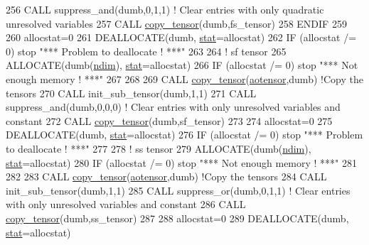 \begin{DoxyCode}
256         \textcolor{keyword}{CALL }suppress\_and(dumb,0,1,1) \textcolor{comment}{! Clear entries with only quadratic unresolved variables }
257         \textcolor{keyword}{CALL }\hyperlink{namespacetensor_a4a88ee8077278486c5128ad97617969e}{copy\_tensor}(dumb,fs\_tensor)
258 \textcolor{keywordflow}{    ENDIF}
259 
260     allocstat=0
261     \textcolor{keyword}{DEALLOCATE}(dumb, \hyperlink{namespacestat}{stat}=allocstat)
262     \textcolor{keywordflow}{IF} (allocstat /= 0)  stop \textcolor{stringliteral}{"*** Problem to deallocate ! ***"}
263 
264     \textcolor{comment}{! sf tensor}
265     \textcolor{keyword}{ALLOCATE}(dumb(\hyperlink{namespaceparams_a2323fe1773f086e20c14f266351c482b}{ndim}), \hyperlink{namespacestat}{stat}=allocstat)
266     \textcolor{keywordflow}{IF} (allocstat /= 0) stop \textcolor{stringliteral}{"*** Not enough memory ! ***"}
267 
268 
269     \textcolor{keyword}{CALL }\hyperlink{namespacetensor_a4a88ee8077278486c5128ad97617969e}{copy\_tensor}(\hyperlink{namespaceaotensor__def_a0dc43bc9294a18f2fe57b67489f1702f}{aotensor},dumb) \textcolor{comment}{!Copy the tensors}
270     \textcolor{keyword}{CALL }init\_sub\_tensor(dumb,1,1)
271     \textcolor{keyword}{CALL }suppress\_and(dumb,0,0,0) \textcolor{comment}{! Clear entries with only unresolved variables and constant}
272     \textcolor{keyword}{CALL }\hyperlink{namespacetensor_a4a88ee8077278486c5128ad97617969e}{copy\_tensor}(dumb,sf\_tensor)
273 
274     allocstat=0
275     \textcolor{keyword}{DEALLOCATE}(dumb, \hyperlink{namespacestat}{stat}=allocstat)
276     \textcolor{keywordflow}{IF} (allocstat /= 0)  stop \textcolor{stringliteral}{"*** Problem to deallocate ! ***"}
277 
278     \textcolor{comment}{! ss tensor}
279     \textcolor{keyword}{ALLOCATE}(dumb(\hyperlink{namespaceparams_a2323fe1773f086e20c14f266351c482b}{ndim}), \hyperlink{namespacestat}{stat}=allocstat)
280     \textcolor{keywordflow}{IF} (allocstat /= 0) stop \textcolor{stringliteral}{"*** Not enough memory ! ***"}
281 
282 
283     \textcolor{keyword}{CALL }\hyperlink{namespacetensor_a4a88ee8077278486c5128ad97617969e}{copy\_tensor}(\hyperlink{namespaceaotensor__def_a0dc43bc9294a18f2fe57b67489f1702f}{aotensor},dumb) \textcolor{comment}{!Copy the tensors}
284     \textcolor{keyword}{CALL }init\_sub\_tensor(dumb,1,1)
285     \textcolor{keyword}{CALL }suppress\_or(dumb,0,1,1) \textcolor{comment}{! Clear entries with only unresolved variables and constant}
286     \textcolor{keyword}{CALL }\hyperlink{namespacetensor_a4a88ee8077278486c5128ad97617969e}{copy\_tensor}(dumb,ss\_tensor)
287 
288     allocstat=0
289     \textcolor{keyword}{DEALLOCATE}(dumb, \hyperlink{namespacestat}{stat}=allocstat)

\end{DoxyCode}
